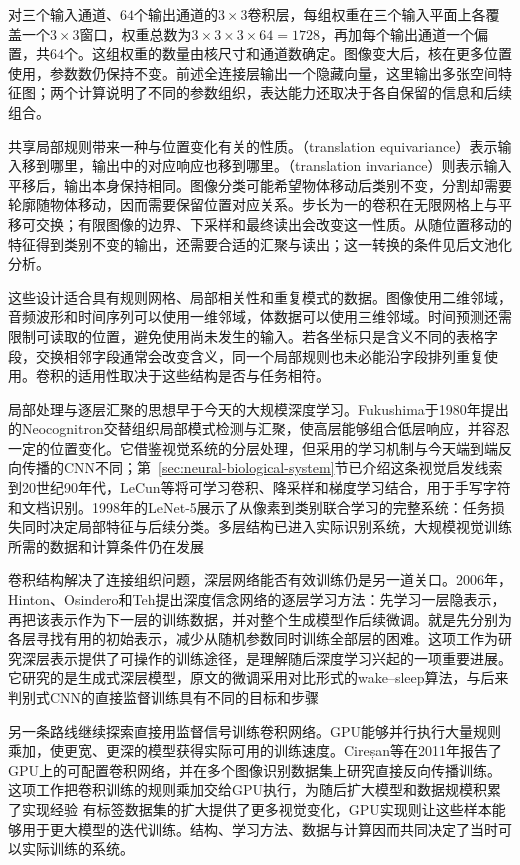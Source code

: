 对三个输入通道、$64$个输出通道的$3\times3$卷积层，每组权重在三个输入平面上各覆盖一个$3\times3$窗口，权重总数为$3\times3\times3\times64=1728$，再加每个输出通道一个偏置，共$64$个。这组权重的数量由核尺寸和通道数确定。图像变大后，核在更多位置使用，参数数仍保持不变。前述全连接层输出一个隐藏向量，这里输出多张空间特征图；两个计算说明了不同的参数组织，表达能力还取决于各自保留的信息和后续组合。

共享局部规则带来一种与位置变化有关的性质。（translation equivariance）表示输入移到哪里，输出中的对应响应也移到哪里。（translation invariance）则表示输入平移后，输出本身保持相同。图像分类可能希望物体移动后类别不变，分割却需要轮廓随物体移动，因而需要保留位置对应关系。步长为一的卷积在无限网格上与平移可交换；有限图像的边界、下采样和最终读出会改变这一性质。从随位置移动的特征得到类别不变的输出，还需要合适的汇聚与读出；这一转换的条件见后文池化分析。

这些设计适合具有规则网格、局部相关性和重复模式的数据。图像使用二维邻域，音频波形和时间序列可以使用一维邻域，体数据可以使用三维邻域。时间预测还需限制可读取的位置，避免使用尚未发生的输入。若各坐标只是含义不同的表格字段，交换相邻字段通常会改变含义，同一个局部规则也未必能沿字段排列重复使用。卷积的适用性取决于这些结构是否与任务相符。

局部处理与逐层汇聚的思想早于今天的大规模深度学习。Fukushima于1980年提出的Neocognitron交替组织局部模式检测与汇聚，使高层能够组合低层响应，并容忍一定的位置变化。它借鉴视觉系统的分层处理，但采用的学习机制与今天端到端反向传播的CNN不同；第~\ref{sec:neural-biological-system}节已介绍这条视觉启发线索
到20世纪90年代，LeCun等将可学习卷积、降采样和梯度学习结合，用于手写字符和文档识别。1998年的LeNet-5展示了从像素到类别联合学习的完整系统：任务损失同时决定局部特征与后续分类。多层结构已进入实际识别系统，大规模视觉训练所需的数据和计算条件仍在发展

卷积结构解决了连接组织问题，深层网络能否有效训练仍是另一道关口。2006年，Hinton、Osindero和Teh提出深度信念网络的逐层学习方法：先学习一层隐表示，再把该表示作为下一层的训练数据，并对整个生成模型作后续微调。就是先分别为各层寻找有用的初始表示，减少从随机参数同时训练全部层的困难。这项工作为研究深层表示提供了可操作的训练途径，是理解随后深度学习兴起的一项重要进展。它研究的是生成式深层模型，原文的微调采用对比形式的wake--sleep算法，与后来判别式CNN的直接监督训练具有不同的目标和步骤

另一条路线继续探索直接用监督信号训练卷积网络。GPU能够并行执行大量规则乘加，使更宽、更深的模型获得实际可用的训练速度。Cireșan等在2011年报告了GPU上的可配置卷积网络，并在多个图像识别数据集上研究直接反向传播训练。这项工作把卷积训练的规则乘加交给GPU执行，为随后扩大模型和数据规模积累了实现经验
有标签数据集的扩大提供了更多视觉变化，GPU实现则让这些样本能够用于更大模型的迭代训练。结构、学习方法、数据与计算因而共同决定了当时可以实际训练的系统。

